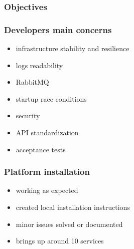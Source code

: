 \documentclass{beamer}
\begin{document}
  \begin{frame}
    \frametitle{Objectives}
  \end{frame}

  \begin{frame}
    \frametitle{Developers main concerns}

    \begin{itemize}
      \item infrastructure stability and resilience
      \item logs readability
      \item RabbitMQ
      \item startup race conditions
      \item security
      \item API standardization
      \item acceptance tests
    \end{itemize}
  \end{frame}

  \begin{frame}
    \frametitle{Platform installation}

    \begin{itemize}
      \item working as expected
      \item created local installation instructions
      \item minor issues solved or documented
      \item brings up around 10 services
    \end{itemize}
  \end{frame}
\end{document}
